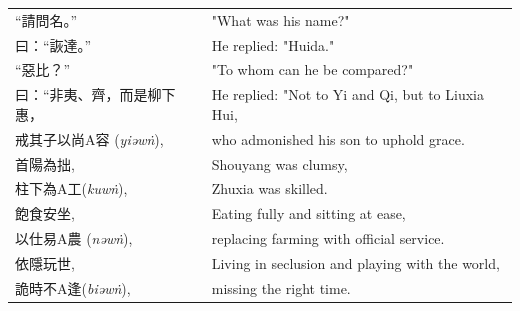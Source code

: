 \begin{longtable}{p{} p{}}







``請問名。'' & "What was his name?"\\

曰：``詼達。'' & He replied: "Huida."\\

``惡比？'' & "To whom can he be compared?"\\

曰：``非夷、齊，而是柳下惠， & He replied: "Not to Yi and Qi, but to Liuxia Hui,\\

戒其子以尚A容 (\textit{yiəwṅ}),
& who admonished his son to uphold grace. %
\\

首陽為拙, 
& Shouyang was clumsy, 
\\

柱下為A工(\textit{kuwṅ}),
& Zhuxia was skilled. %
\\

飽食安坐, 
& Eating fully and sitting at ease, 
\\

以仕易A農 (\textit{nəwṅ}),
&  replacing farming with official service. %
\\

依隱玩世,
& Living in seclusion and playing with the world, 
\\


詭時不A逢(\textit{biəwṅ}),
&  missing the right time. %
\\


\end{longtable}

